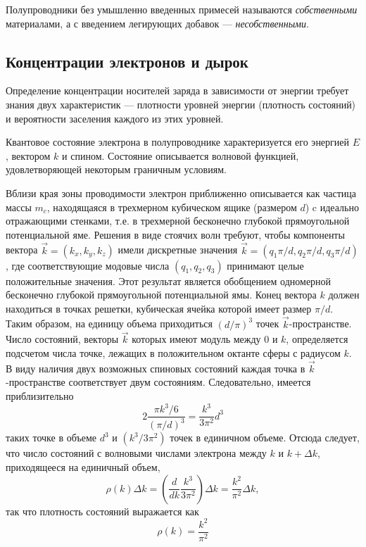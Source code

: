 \documentclass[a4paper, 12pt]{article}
\begin{document}
Полупроводники без умышленно введенных примесей называются
\emph{собственными} материалами, а с введением легирующих добавок ---
\emph{несобственными}.

\subsection{Концентрации электронов и дырок}
Определение концентрации носителей заряда в зависимости от энергии
требует знания двух характеристик --- плотности уровней энергии
(плотность состояний) и вероятности заселения каждого из этих уровней.

Квантовое состояние электрона в полупроводнике характеризуется его
энергией $E$, вектором $k$ и спином. Состояние описывается волновой
функцией, удовлетворяющей некоторым граничным условиям.

Вблизи края зоны проводимости электрон приближенно описывается как
частица массы $m_{c}$, находящаяся в трехмерном кубическом ящике
(размером $d$) c идеально отражающими стенками, т.е. в трехмерной
бесконечно глубокой прямоугольной потенциальной яме. Решения в виде
стоячих волн требуют, чтобы компоненты вектора
$\vec{k}=(k_{x},k_{y},k_{z})$ имели дискретные значения
$\vec{k}=(q_{1}\pi/d,q_{2}\pi /d,q_{3}\pi/d)$, где соответствующие
модовые числа $(q_{1},q_{2},q_{3})$ принимают целые положительные
значения. Этот результат является обобщением одномерной бесконечно
глубокой прямоугольной потенциальной ямы. Конец вектора $k$ должен
находиться в точках решетки, кубическая ячейка которой имеет размер
$\pi/d$. Таким образом, на единицу объема приходиться $(d/\pi)^3$
точек $\vec{k}$-пространстве. Число состояний, векторы $\vec{k}$
которых имеют модуль между $0$ и $k$, определяется подсчетом числа
точке, лежащих в положительном октанте сферы с радиусом $k$. В виду
наличия двух возможных спиновых состояний каждая точка в
$\vec{k}$-пространстве соответствует двум состояниям. Следовательно,
имеется приблизительно
\[
    2 \frac{\pi k^3/6}{(\pi/d)^3}= \frac{k^3}{3\pi^2}d^3
\]
таких точке в объеме $d^3$ и $(k^3/3\pi^2)$ точек в единичном объеме.
Отсюда следует, что число состояний с волновыми числами электрона
между $k$ и $k+\Delta k$, приходящееся на единичный объем,
\[
    \rho (k)\Delta k = \left( \frac{d}{dk}
    \frac{k^3}{3\pi^2}\right)\Delta k= \frac{k^2}{\pi^2}\Delta k,
\]
так что плотность состояний выражается как
\begin{equation}
    \rho(k) = \frac{k^2}{\pi^2}
    \label{eq:4}
\end{equation}
\end{document}
